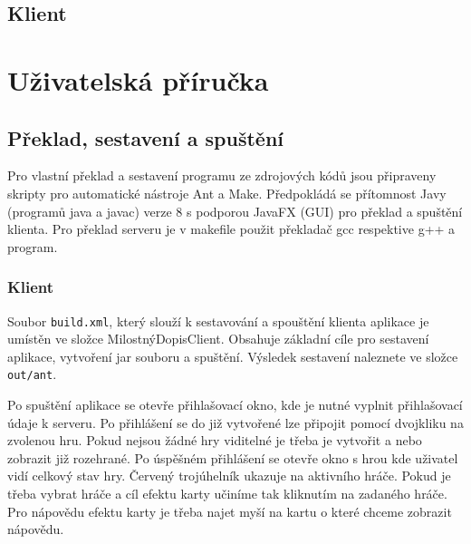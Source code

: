 \documentclass[12pt, a4paper]{article}
\begin{document}
\subsection{Klient}

\section{Uživatelská příručka} %

\subsection{Překlad, sestavení a spuštění }

Pro vlastní překlad a sestavení programu ze zdrojových kódů jsou připraveny skripty pro automatické nástroje Ant a Make. Předpokládá se přítomnost Javy (programů java a javac) verze 8 s podporou JavaFX (GUI) pro překlad a spuštění klienta. Pro překlad serveru je v makefile použit překladač gcc respektive g++ a program.


\subsubsection{Klient}
Soubor \texttt{build.xml}, který slouží k sestavování a spouštění klienta aplikace je umístěn ve složce MilostnýDopisClient. Obsahuje základní cíle pro sestavení aplikace, vytvoření jar souboru a spuštění. Výsledek sestavení naleznete ve složce \texttt{out/ant}.

Po spuštění aplikace se otevře přihlašovací okno, kde je nutné vyplnit přihlašovací údaje k serveru. Po přihlášení se do již vytvořené lze připojit pomocí dvojkliku na zvolenou hru. Pokud nejsou žádné hry viditelné je třeba je vytvořit a nebo zobrazit již rozehrané.
Po úspěšném přihlášení se otevře okno s hrou kde uživatel vidí celkový stav hry. Červený trojúhelník ukazuje na aktivního hráče. Pokud je třeba vybrat hráče a cíl efektu karty učiníme tak kliknutím na zadaného hráče. Pro nápovědu efektu karty je třeba najet myší na kartu o které chceme zobrazit nápovědu.
\end{document}

